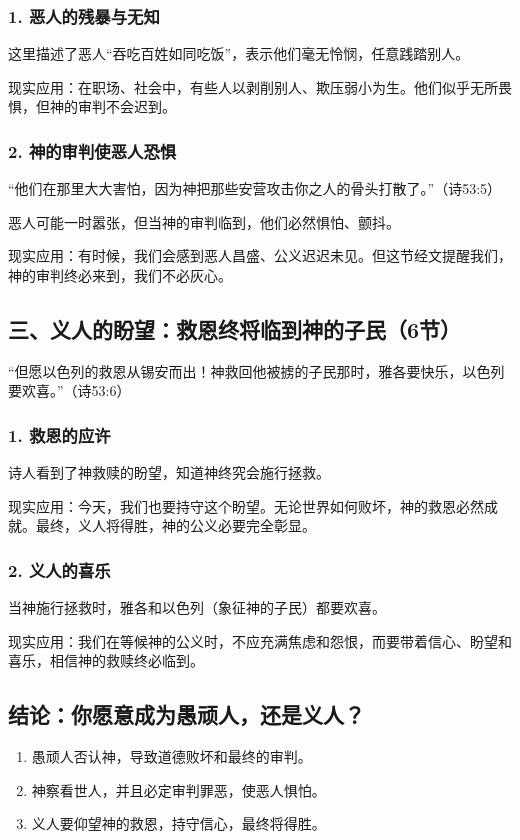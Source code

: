 \documentclass[a4paper, 12pt]{article}
\begin{document}
\subsubsection*{1. 恶人的残暴与无知}
\hspace{0.6cm}这里描述了恶人“吞吃百姓如同吃饭”，表示他们毫无怜悯，任意践踏别人。

现实应用：在职场、社会中，有些人以剥削别人、欺压弱小为生。他们似乎无所畏惧，但神的审判不会迟到。
\subsubsection*{2. 神的审判使恶人恐惧}
“他们在那里大大害怕，因为神把那些安营攻击你之人的骨头打散了。”（诗53:5）

恶人可能一时嚣张，但当神的审判临到，他们必然惧怕、颤抖。

现实应用：有时候，我们会感到恶人昌盛、公义迟迟未见。但这节经文提醒我们，神的审判终必来到，我们不必灰心。
\subsection*{三、义人的盼望：救恩终将临到神的子民（6节）}
“但愿以色列的救恩从锡安而出！神救回他被掳的子民那时，雅各要快乐，以色列要欢喜。”（诗53:6）

\subsubsection*{1. 救恩的应许}
\hspace{0.6cm}诗人看到了神救赎的盼望，知道神终究会施行拯救。

现实应用：今天，我们也要持守这个盼望。无论世界如何败坏，神的救恩必然成就。最终，义人将得胜，神的公义必要完全彰显。
\subsubsection*{2. 义人的喜乐}
\hspace{0.6cm}当神施行拯救时，雅各和以色列（象征神的子民）都要欢喜。

现实应用：我们在等候神的公义时，不应充满焦虑和怨恨，而要带着信心、盼望和喜乐，相信神的救赎终必临到。
\subsection*{结论：你愿意成为愚顽人，还是义人？}
\begin{enumerate}
    \item 愚顽人否认神，导致道德败坏和最终的审判。

    \item 神察看世人，并且必定审判罪恶，使恶人惧怕。

    \item 义人要仰望神的救恩，持守信心，最终将得胜。

\end{enumerate}
\end{document}
